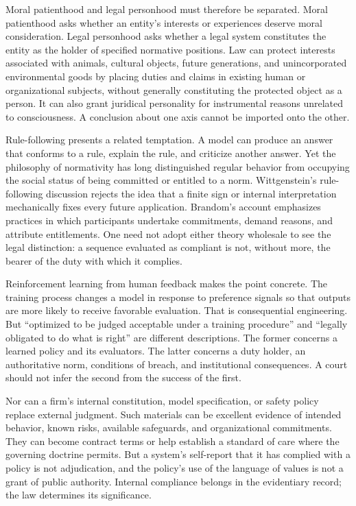 Moral patienthood and legal personhood must therefore be separated. Moral patienthood asks whether an entity's interests or experiences deserve moral consideration. Legal personhood asks whether a legal system constitutes the entity as the holder of specified normative positions. Law can protect interests associated with animals, cultural objects, future generations, and unincorporated environmental goods by placing duties and claims in existing human or organizational subjects, without generally constituting the protected object as a person. It can also grant juridical personality for instrumental reasons unrelated to consciousness. A conclusion about one axis cannot be imported onto the other.

Rule-following presents a related temptation. A model can produce an answer that conforms to a rule, explain the rule, and criticize another answer. Yet the philosophy of normativity has long distinguished regular behavior from occupying the social status of being committed or entitled to a norm. Wittgenstein's rule-following discussion rejects the idea that a finite sign or internal interpretation mechanically fixes every future application. Brandom's account emphasizes practices in which participants undertake commitments, demand reasons, and attribute entitlements. One need not adopt either theory wholesale to see the legal distinction: a sequence evaluated as compliant is not, without more, the bearer of the duty with which it complies.

Reinforcement learning from human feedback makes the point concrete. The training process changes a model in response to preference signals so that outputs are more likely to receive favorable evaluation. That is consequential engineering. But ``optimized to be judged acceptable under a training procedure'' and ``legally obligated to do what is right'' are different descriptions. The former concerns a learned policy and its evaluators. The latter concerns a duty holder, an authoritative norm, conditions of breach, and institutional consequences. A court should not infer the second from the success of the first.

Nor can a firm's internal constitution, model specification, or safety policy replace external judgment. Such materials can be excellent evidence of intended behavior, known risks, available safeguards, and organizational commitments. They can become contract terms or help establish a standard of care where the governing doctrine permits. But a system's self-report that it has complied with a policy is not adjudication, and the policy's use of the language of values is not a grant of public authority. Internal compliance belongs in the evidentiary record; the law determines its significance.

